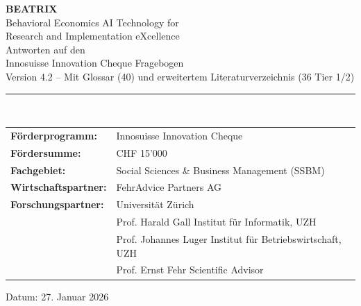 \documentclass[11pt,a4paper]{article}
\begin{document}

\begin{titlepage}
\centering
\vspace*{2cm}

{\Huge\bfseries\color{fehrblue} BEATRIX}\\[0.5cm]
{\Large Behavioral Economics AI Technology for\\Research and Implementation eXcellence}\\[2cm]

{\LARGE Antworten auf den\\Innosuisse Innovation Cheque Fragebogen}\\[1cm]

{\large Version 4.2 -- Mit Glossar (40) und erweitertem Literaturverzeichnis (36 Tier 1/2)}\\[2cm]

\rule{0.8\textwidth}{0.5pt}\\[1.5cm]

\begin{tabular}{ll}
\textbf{Förderprogramm:} & Innosuisse Innovation Cheque \\[0.3cm]
\textbf{Fördersumme:} & CHF 15'000 \\[0.3cm]
\textbf{Fachgebiet:} & Social Sciences \& Business Management (SSBM) \\[0.3cm]
\textbf{Wirtschaftspartner:} & FehrAdvice Partners AG \\[0.3cm]
\textbf{Forschungspartner:} & Universität Zürich \\[0.3cm]
& Prof. Harald Gall \quad Institut für Informatik, UZH \\
& Prof. Johannes Luger \quad Institut für Betriebswirtschaft, UZH \\
& Prof. Ernst Fehr \quad Scientific Advisor \\
\end{tabular}

\vfill


\vfill

{\large Datum: 27. Januar 2026}

\end{titlepage}
\end{document}
